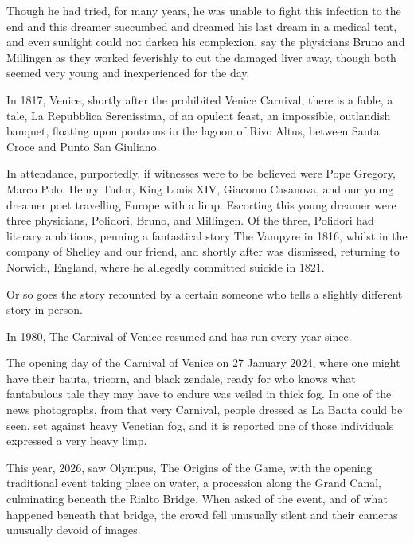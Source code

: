 Though he had tried, for many years, he was unable to fight this
infection to the end and this dreamer succumbed and dreamed his last
dream in a medical tent, and even sunlight could not darken his
complexion, say the physicians Bruno and Millingen as they worked
feverishly to cut the damaged liver away, though both seemed very
young and inexperienced for the day.

In 1817, Venice, shortly after the prohibited Venice Carnival, there
is a fable, a tale, La Repubblica Serenissima, of an opulent feast, an
impossible, outlandish banquet, floating upon pontoons in the lagoon
of Rivo Altus, between Santa Croce and Punto San Giuliano.

In attendance, purportedly, if witnesses were to be believed were Pope
Gregory, Marco Polo, Henry Tudor, King Louis XIV, Giacomo Casanova,
and our young dreamer poet travelling Europe with a limp. Escorting
this young dreamer were three physicians, Polidori, Bruno, and
Millingen. Of the three, Polidori had literary ambitions, penning a
fantastical story The Vampyre in 1816, whilst in the company of
Shelley and our friend, and shortly after was dismissed, returning to
Norwich, England, where he allegedly committed suicide in 1821.

Or so goes the story recounted by a certain someone who tells a
slightly different story in person.

In 1980, The Carnival of Venice resumed and has run every year since.

The opening day of the Carnival of Venice on 27 January 2024, where
one might have their bauta, tricorn, and black zendale, ready for who
knows what fantabulous tale they may have to endure was veiled in
thick fog. In one of the news photographs, from that very Carnival,
people dressed as La Bauta could be seen, set against heavy Venetian
fog, and it is reported one of those individuals expressed a very
heavy limp.

This year, 2026, saw Olympus, The Origins of the Game, with the
opening traditional event taking place on water, a procession along
the Grand Canal, culminating beneath the Rialto Bridge. When asked of
the event, and of what happened beneath that bridge, the crowd fell
unusually silent and their cameras unusually devoid of images.

\endinput

Sadie, thank you for asking me about this. I thought about this piece
which I wrote for a poetry evening a few years ago, I read it there
once, but it is unpublished. It is based on a mix of true events and
fiction and I have reworked and updated it for your format,

